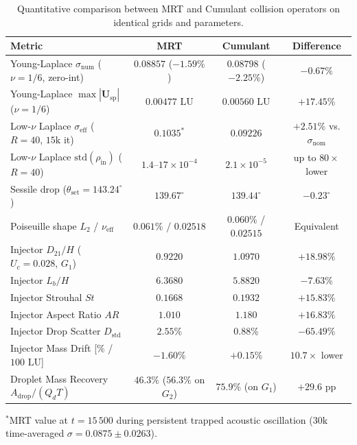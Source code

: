 \documentclass[11pt,a4paper]{article}
\begin{document}
\begin{table}[H]
\centering
\caption{Quantitative comparison between MRT and Cumulant collision operators on identical grids and parameters.}
\label{tab:mrt_vs_cum}
\small
\setlength{\tabcolsep}{5pt}
\begin{tabular}{@{}lccc@{}}
\toprule
\textbf{Metric} & \textbf{MRT} & \textbf{Cumulant} & \textbf{Difference} \\
\midrule
Young-Laplace $\sigma_{\mathrm{num}}$ ($\nu = 1/6$, zero-int) & $0.08857$ ($-1.59\%$) & $0.08798$ ($-2.25\%$) & $-0.67\%$ \\
Young-Laplace $\max|\mathbf{U}_{\mathrm{sp}}|$ ($\nu = 1/6$) & $0.00477\text{ LU}$ & $0.00560\text{ LU}$ & $+17.45\%$ \\
Low-$\nu$ Laplace $\sigma_{\mathrm{eff}}$ ($R=40$, $15\text{k}$ it) & $0.1035^*$ & $0.09226$ & $+2.51\%$ vs. $\sigma_{\mathrm{nom}}$ \\
Low-$\nu$ Laplace $\mathrm{std}(\rho_{\mathrm{in}})$ ($R=40$) & $1.4\text{--}17\times 10^{-4}$ & $2.1\times 10^{-5}$ & up to $80\times$ lower \\
Sessile drop ($\theta_{\mathrm{set}} = 143.24^\circ$) & $139.67^\circ$ & $139.44^\circ$ & $-0.23^\circ$ \\
Poiseuille shape $L_2$ / $\nu_{\mathrm{eff}}$ & $0.061\%$ / $0.02518$ & $0.060\%$ / $0.02515$ & Equivalent \\
\midrule
Injector $D_{21}/H$ ($U_c = 0.028$, $G_1$) & $0.9220$ & $1.0970$ & $+18.98\%$ \\
Injector $L_b/H$ & $6.3680$ & $5.8820$ & $-7.63\%$ \\
Injector Strouhal $St$ & $0.1668$ & $0.1932$ & $+15.83\%$ \\
Injector Aspect Ratio $AR$ & $1.010$ & $1.180$ & $+16.83\%$ \\
Injector Drop Scatter $D_{\mathrm{std}}$ & $2.55\%$ & $0.88\%$ & $-65.49\%$ \\
Injector Mass Drift [\% / $100\text{ LU}$] & $-1.60\%$ & $+0.15\%$ & $10.7\times$ lower \\
Droplet Mass Recovery $A_{\mathrm{drop}} / (Q_d T)$ & $46.3\%$ ($56.3\%$ on $G_2$) & $75.9\%$ (on $G_1$) & $+29.6\text{ pp}$ \\
\bottomrule
\end{tabular}

\vspace{4pt}
\begin{minipage}{0.96\textwidth}
\footnotesize $^*$MRT value at $t = 15\,500$ during persistent trapped acoustic oscillation ($30\text{k}$ time-averaged $\sigma = 0.0875 \pm 0.0263$).
\end{minipage}
\end{table}
\end{document}
